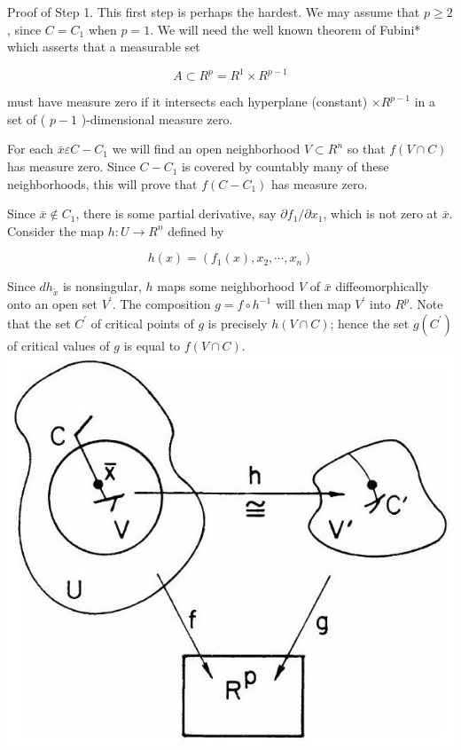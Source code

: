 \documentclass[10pt, letterpaper]{article}
\begin{document}
Proof of Step 1. This first step is perhaps the hardest. We may assume that $p \geq 2$, since $C=C_{1}$ when $p=1$. We will need the well known theorem of Fubini* which asserts that a measurable set

$$
A \subset R^{p}=R^{1} \times R^{p-1}
$$

must have measure zero if it intersects each hyperplane (constant) $\times R^{p-1}$ in a set of ( $p-1$ )-dimensional measure zero.

For each $\bar{x} \varepsilon C-C_{1}$ we will find an open neighborhood $V \subset R^{n}$ so that $f(V \cap C)$ has measure zero. Since $C-C_{1}$ is covered by countably many of these neighborhoods, this will prove that $f\left(C-C_{1}\right)$ has measure zero.

Since $\bar{x} \notin C_{1}$, there is some partial derivative, say $\partial f_{1} / \partial x_{1}$, which is not zero at $\bar{x}$. Consider the map $h: U \rightarrow R^{n}$ defined by

$$
h(x)=\left(f_{1}(x), x_{2}, \cdots, x_{n}\right)
$$

Since $d h_{\tilde{x}}$ is nonsingular, $h$ maps some neighborhood $V$ of $\bar{x}$ diffeomorphically onto an open set $V^{\prime}$. The composition $g=f \circ h^{-1}$ will then map $V^{\prime}$ into $R^{p}$. Note that the set $C^{\prime}$ of critical points of $g$ is precisely $h(V \cap C)$; hence the set $g\left(C^{\prime}\right)$ of critical values of $g$ is equal to $f(V \cap C)$.\\
\includegraphics[scale=0.2, center]{2025_05_28_7c9927389b272ddbc2c3g-28}
\end{document}
